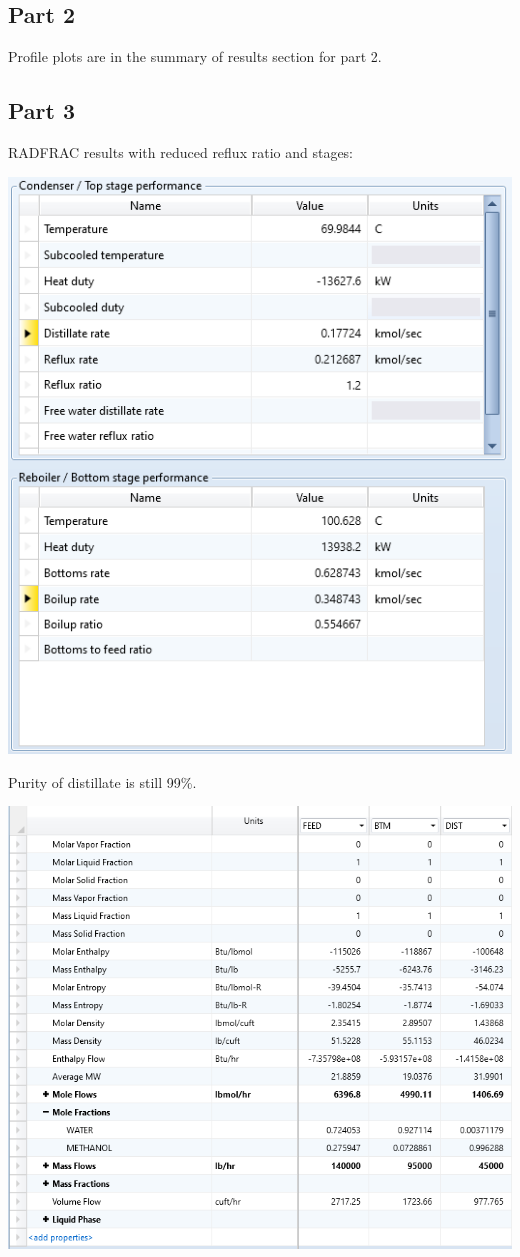 \documentclass[12pt]{article}
\begin{document}
\subsection{Part 2}

Profile plots are in the summary of results section for part 2.

\subsection{Part 3}

RADFRAC results with reduced reflux ratio and stages:

\includegraphics{part3.png}

Purity of distillate is still 99\%.

\includegraphics[scale=0.8]{stream3.png}
\end{document}
